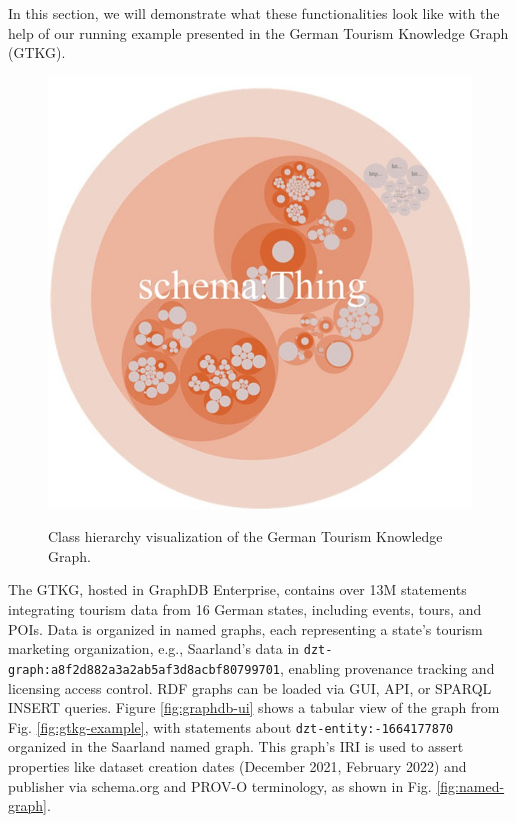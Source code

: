 \documentclass[12pt]{article}
\begin{document}
In this section, we will demonstrate what these functionalities look like with the help of our running example presented in the German Tourism Knowledge Graph (GTKG).
\begin{figure}
    \includegraphics[width=\linewidth]{imgs/19.8.jpeg}
    \label{fig:class-hierarchy-example}
    \caption{Class hierarchy visualization of the German Tourism Knowledge Graph.}
\end{figure}

The GTKG, hosted in GraphDB Enterprise, contains over 13M statements integrating tourism data from 16 German states, including events, tours, and POIs. Data is organized in named graphs, each representing a state’s tourism marketing organization, e.g., Saarland’s data in \verb|dzt-graph:a8f2d882a3a2ab5af3d8acbf80799701|, enabling provenance tracking and licensing access control. RDF graphs can be loaded via GUI, API, or SPARQL INSERT queries. Figure \ref{fig:graphdb-ui} shows a tabular view of the graph from Fig. \ref{fig:gtkg-example}, with statements about \verb|dzt-entity:-1664177870| organized in the Saarland named graph. This graph’s IRI is used to assert properties like dataset creation dates (December 2021, February 2022) and publisher via schema.org and PROV-O terminology, as shown in Fig. \ref{fig:named-graph}.
\end{document}
